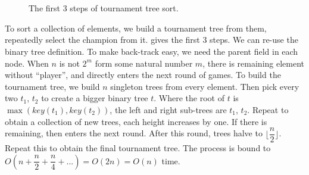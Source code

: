 \documentclass[b5paper]{article}
\begin{document}
\captionsetup[subfigure]{labelformat=empty, margin=10pt}
\begin{figure}[htbp]
  \centering
   \\
   \\
  \caption{The first 3 steps of tournament tree sort.}
  \label{fig:tournament-tree-4}
\end{figure}
\captionsetup[subfigure]{labelformat=parens}

To sort a collection of elements, we build a tournament tree from them, repeatedly select the champion from it.  gives the first 3 steps. We can re-use the binary tree definition. To make back-track easy, we need the parent field in each node. When $n$ is not $2^m$ form some natural number $m$, there is remaining element without ``player'', and directly enters the next round of games. To build the tournament tree, we build $n$ singleton trees from every element. Then pick every two $t_1$, $t_2$ to create a bigger binary tree $t$. Where the root of $t$ is $\max(key(t_1), key(t_2))$, the left and right sub-trees are $t_1$, $t_2$. Repeat to obtain a collection of new trees, each height increases by one. If there is remaining, then enters the next round. After this round, trees halve to $\lfloor \dfrac{n}{2} \rfloor$. Repeat this to obtain the final tournament tree. The process is bound to $O(n + \dfrac{n}{2} + \dfrac{n}{4} + ... ) = O(2n) = O(n)$ time.
\end{document}
